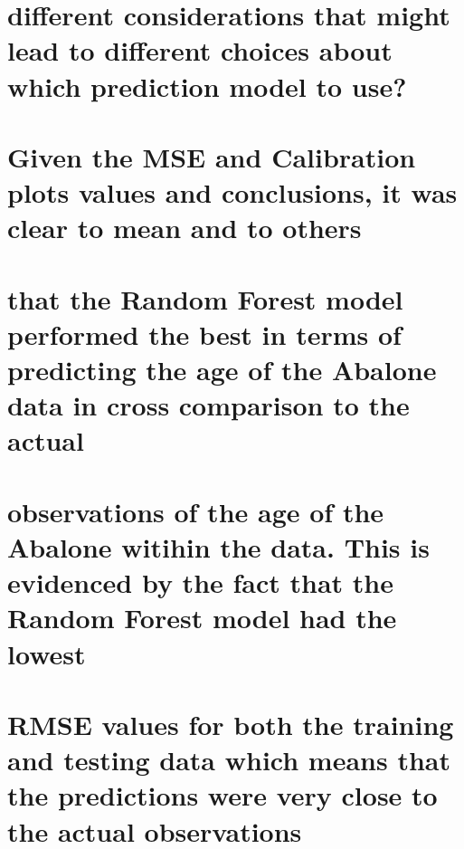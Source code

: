 \documentclass[
  letterpaper,
  DIV=11,
  numbers=noendperiod]{scrreprt}
\begin{document}
{\chapter{different considerations that might lead to different choices
about which prediction model to
use?}\label{different-considerations-that-might-lead-to-different-choices-about-which-prediction-model-to-use}


\chapter{Given the MSE and Calibration plots values and conclusions, it
was clear to mean and to
others}\label{given-the-mse-and-calibration-plots-values-and-conclusions-it-was-clear-to-mean-and-to-others}


\chapter{that the Random Forest model performed the best in terms of
predicting the age of the Abalone data in cross comparison to the
actual}\label{that-the-random-forest-model-performed-the-best-in-terms-of-predicting-the-age-of-the-abalone-data-in-cross-comparison-to-the-actual}


\chapter{observations of the age of the Abalone witihin the data. This
is evidenced by the fact that the Random Forest model had the
lowest}\label{observations-of-the-age-of-the-abalone-witihin-the-data.-this-is-evidenced-by-the-fact-that-the-random-forest-model-had-the-lowest}


\chapter{RMSE values for both the training and testing data which means
that the predictions were very close to the actual
observations}\label{rmse-values-for-both-the-training-and-testing-data-which-means-that-the-predictions-were-very-close-to-the-actual-observations}


}
\end{document}
